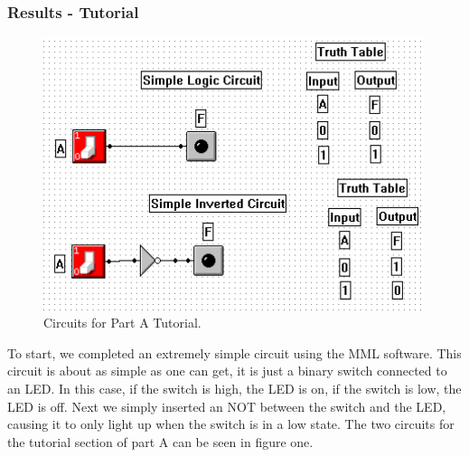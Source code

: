 \documentclass[a4paper,11pt]{article}
\begin{document}
\subsubsection{Results - Tutorial} 
 \begin{figure}
     \includegraphics[width=4.4in]{PartACircuit}
   \caption{Circuits for Part A Tutorial.}
   \label{fig:tutorial}
\end{figure} 
To start, we completed an extremely simple circuit using the MML software. This circuit is about as simple as one can get, it is just a binary switch connected to an LED. In this case, if the switch is high, the LED is on, if the switch is low, the LED is off. Next we simply inserted an NOT between the switch and the LED, causing it to only light up when the switch is in a low state. The two circuits for the tutorial section of part A can be seen in figure one. 
\end{document}
